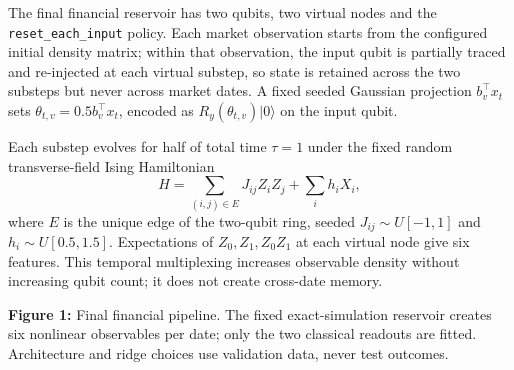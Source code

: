 \documentclass[11pt,a4paper]{article}
\begin{document}
The final financial reservoir has two qubits, two virtual nodes and the
\texttt{reset\_each\_input} policy. Each market observation starts from the
configured initial density matrix; within that observation, the input qubit is
partially traced and re-injected at each virtual substep, so state is retained
across the two substeps but never across market dates. A fixed seeded Gaussian
projection \(b_v^\top x_t\) sets
\(\theta_{t,v}=0.5b_v^\top x_t\), encoded as
\(R_y(\theta_{t,v})|0\rangle\) on the input qubit.

Each substep evolves for half of total time \(\tau=1\) under the fixed random
transverse-field Ising Hamiltonian
\[
 H=\sum_{(i,j)\in E}J_{ij}Z_iZ_j+\sum_i h_iX_i,
\]
where \(E\) is the unique edge of the two-qubit ring, seeded
\(J_{ij}\!\sim U[-1,1]\) and \(h_i\!\sim U[0.5,1.5]\).
Expectations of \(Z_0,Z_1,Z_0Z_1\) at each virtual node give six features.
This temporal multiplexing increases observable density without increasing
qubit count; it does not create cross-date memory.

\begin{center}
\begin{minipage}{\linewidth}
\centering
{}
\par\smallskip
{\small\textbf{Figure 1:} Final financial pipeline. The fixed exact-simulation reservoir creates
six nonlinear observables per date; only the two classical readouts are fitted.
Architecture and ridge choices use validation data, never test outcomes.\par}
\end{minipage}
\end{center}
\end{document}

